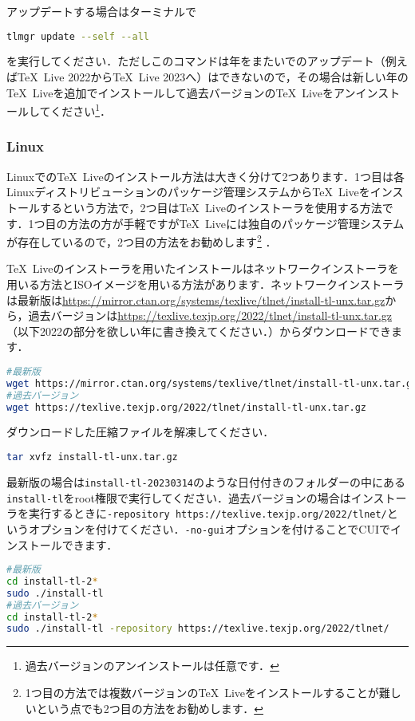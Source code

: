 アップデートする場合はターミナルで
\begin{lstlisting}[language=bash]
tlmgr update --self --all
\end{lstlisting}
を実行してください．ただしこのコマンドは年をまたいでのアップデート（例えば\TeX\ Live 2022から\TeX\ Live 2023へ）はできないので，その場合は新しい年の\TeX\ Liveを追加でインストールして過去バージョンの\TeX\ Liveをアンインストールしてください\footnote{過去バージョンのアンインストールは任意です．}．

\subsubsection*{Linux}
Linuxでの\TeX\ Liveのインストール方法は大きく分けて2つあります．1つ目は各Linuxディストリビューションのパッケージ管理システムから\TeX\ Liveをインストールするという方法で，2つ目は\TeX\ Liveのインストーラを使用する方法です．1つ目の方法の方が手軽ですが\TeX\ Liveには独自のパッケージ管理システムが存在しているので，2つ目の方法をお勧めします\footnote{1つ目の方法では複数バージョンの\TeX\ Liveをインストールすることが難しいという点でも2つ目の方法をお勧めします．}	．

\TeX\ Liveのインストーラを用いたインストールはネットワークインストーラを用いる方法とISOイメージを用いる方法があります．ネットワークインストーラは最新版は\url{https://mirror.ctan.org/systems/texlive/tlnet/install-tl-unx.tar.gz}から，過去バージョンは\url{https://texlive.texjp.org/2022/tlnet/install-tl-unx.tar.gz}（以下2022の部分を欲しい年に書き換えてください．）からダウンロードできます．
\begin{lstlisting}[language=bash]
#最新版
wget https://mirror.ctan.org/systems/texlive/tlnet/install-tl-unx.tar.gz
#過去バージョン
wget https://texlive.texjp.org/2022/tlnet/install-tl-unx.tar.gz
\end{lstlisting}
ダウンロードした圧縮ファイルを解凍してください．
\begin{lstlisting}[language=bash]
tar xvfz install-tl-unx.tar.gz
\end{lstlisting}
最新版の場合は\texttt{install-tl-20230314}のような日付付きのフォルダーの中にある\texttt{install-tl}をroot権限で実行してください．過去バージョンの場合はインストーラを実行するときに\texttt{-repository https://texlive.texjp.org/2022/tlnet/}というオプションを付けてください．\texttt{-no-gui}オプションを付けることでCUIでインストールできます．
\begin{lstlisting}[language=bash]
#最新版
cd install-tl-2*
sudo ./install-tl
#過去バージョン
cd install-tl-2*
sudo ./install-tl -repository https://texlive.texjp.org/2022/tlnet/
\end{lstlisting}

